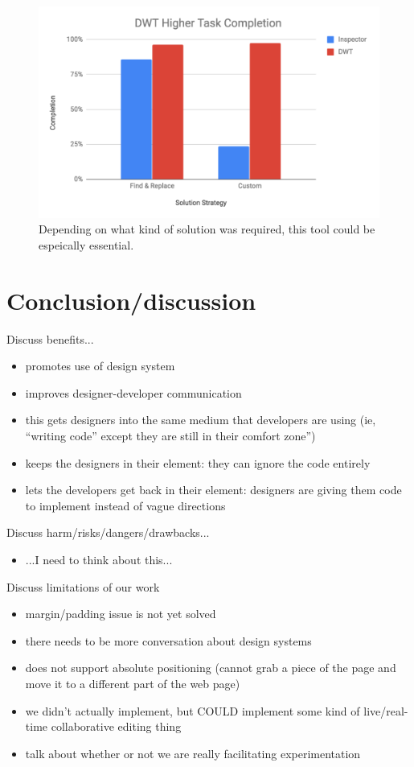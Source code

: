 \documentclass{sigchi}
\begin{document}
\begin{figure}
    \centering
    \includegraphics[width=\columnwidth]{real_figures/higher_task_completion.PNG}
    \caption{Depending on what kind of solution was required, this tool could be espeically essential.}  
    \label{fig:xray_screenshot}
\end{figure}

\section{Conclusion/discussion}
Discuss benefits...
\begin{itemize}
    \item promotes use of design system
    \item improves designer-developer communication
    \item this gets designers into the same medium that developers are using (ie, ``writing code'' except they are still in their comfort zone'')
    \item keeps the designers in their element: they can ignore the code entirely
    \item lets the developers get back in their element: designers are giving them code to implement instead of vague directions 

\end{itemize}

Discuss harm/risks/dangers/drawbacks...
\begin{itemize}
    \item ...I need to think about this...
\end{itemize}

Discuss limitations of our work 
\begin{itemize}
    \item margin/padding issue is not yet solved
    \item there needs to be more conversation about design systems
    \item does not support absolute positioning (cannot grab a piece of the page and move it to a different part of the web page)
    \item we didn't actually implement, but COULD implement some kind of live/real-time collaborative editing thing
    \item talk about whether or not we are really facilitating experimentation

\end{itemize}
\end{document}
